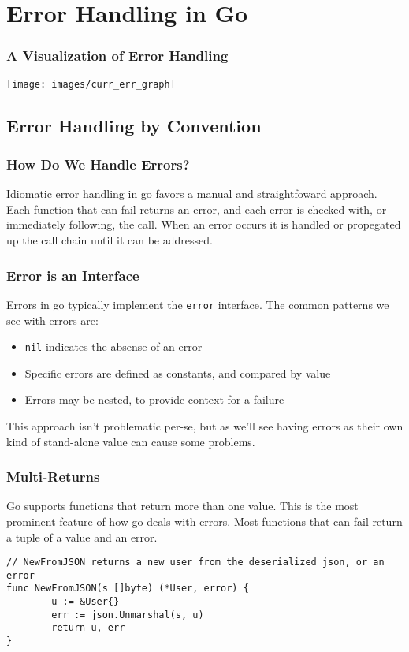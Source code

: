 \documentclass{beamer}
\begin{document}
\section{Error Handling in Go}
\begin{frame}
  \frametitle{A Visualization of Error Handling}
    \begin{center}
    \texttt{[image: images/curr\_err\_graph]}
  \end{center}
\end{frame}

\subsection{Error Handling by Convention}
\begin{frame}
  \frametitle{How Do We Handle Errors?}
  Idiomatic error handling in go favors a manual and straightfoward
  approach. Each function that can fail returns an error, and each
  error is checked with, or immediately following, the call.  When an
  error occurs it is handled or propegated up the call chain until it
  can be addressed.
\end{frame}

\begin{frame}
  \frametitle{Error is an Interface}
  Errors in go typically implement the {\tt error} interface.  The
  common patterns we see with errors are:

  \begin{itemize}
  \item {\tt nil} indicates the absense of an error
  \item Specific errors are defined as constants, and compared by value
  \item Errors may be nested, to provide context for a failure
  \end{itemize}

  This approach isn't problematic per-se, but as we'll see having
  errors as their own kind of stand-alone value can cause some
  problems.
\end{frame}

\begin{frame}[fragile]
  \frametitle{Multi-Returns}
  Go supports functions that return more than one value.  This is the
  most prominent feature of how go deals with errors. Most functions
  that can fail return a tuple of a value and an error.
  \par\pause
\begin{lstlisting}[language=Golang]
// NewFromJSON returns a new user from the deserialized json, or an error
func NewFromJSON(s []byte) (*User, error) {
        u := &User{}
        err := json.Unmarshal(s, u)
        return u, err
}
\end{lstlisting}
\end{frame}
\end{document}
